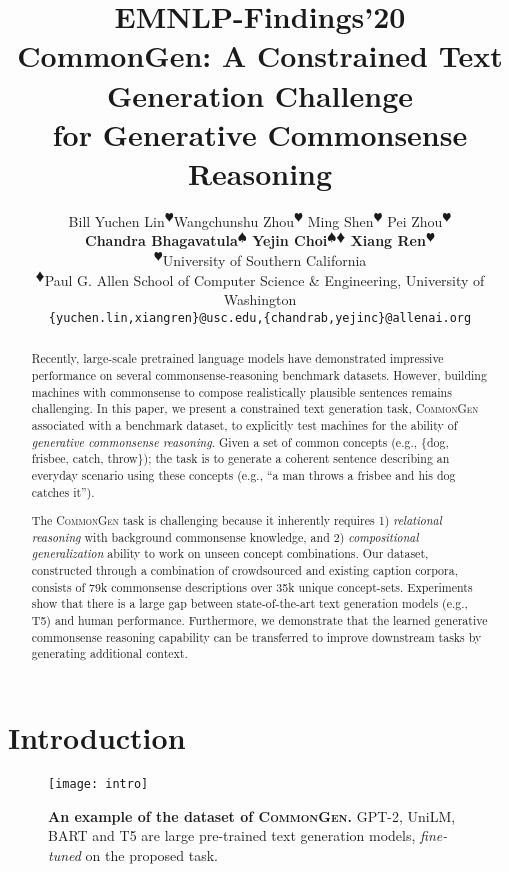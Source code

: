 \documentclass[11pt,a4paper]{article}
\title{\vspace*{-0.5in}
{{\small \hfill EMNLP-Findings'20}\\
\vspace*{.25in}}  {C}ommon{G}en: {A} {C}onstrained {T}ext {G}eneration {C}hallenge \\ for {G}enerative {C}ommonsense {R}easoning}
\author{ 
Bill Yuchen Lin\textsuperscript{{$\varheartsuit$}}\quad  Wangchunshu Zhou\textsuperscript{{$\varheartsuit$}}\quad
Ming Shen\textsuperscript{{$\varheartsuit$}} \quad 
Pei Zhou\textsuperscript{{$\varheartsuit$}} \quad 
\\ \textbf{Chandra Bhagavatula\textsuperscript{{$\spadesuit$}} \quad Yejin Choi\textsuperscript{{$\spadesuit \vardiamondsuit$}}
\quad Xiang Ren\textsuperscript{{$\varheartsuit$}}
}
\\
{{\textsuperscript{$\varheartsuit$}University of Southern California}} \quad {\textsuperscript{$\spadesuit$}Allen Institute for Artificial Intelligence} \\ 
{\textsuperscript{$\vardiamondsuit$}Paul G. Allen School of Computer Science \& Engineering, University of Washington}\\
{
\texttt{\{yuchen.lin,xiangren\}@usc.edu,\{chandrab,yejinc\}@allenai.org}} 
}
\begin{document}
 
\maketitle



\begin{abstract}




Recently, large-scale pretrained language models have demonstrated impressive performance on several commonsense-reasoning benchmark datasets. However, building machines with commonsense to compose realistically plausible sentences remains challenging.
In this paper, we present a constrained text generation task, \textsc{CommonGen} associated with a benchmark dataset, to explicitly test machines for the ability of \textit{generative commonsense reasoning}.
Given a set of common concepts (e.g., \{dog, frisbee, catch, throw\}); the task is to generate a coherent sentence describing an everyday scenario using these concepts (e.g., ``a man throws a frisbee and his dog catches it'').

The \textsc{CommonGen} task is challenging because it inherently requires 1) \textit{relational reasoning} with background  commonsense knowledge, and 2) \textit{compositional generalization} ability to work on unseen concept combinations.
Our dataset, constructed through a combination of crowdsourced and existing caption corpora, consists of 
79k commonsense descriptions over 35k unique concept-sets.
Experiments show that there is  a large gap between state-of-the-art text generation models (e.g., T5) and human performance.
Furthermore, we demonstrate that the learned generative commonsense reasoning capability can be transferred to improve downstream tasks 
by generating additional context.
\end{abstract}

  \section{Introduction}
\label{sec:intro}

\begin{figure}[ht!]
	\centering
	\texttt{[image: intro]}
	\caption{\small{\textbf{An example of the dataset of \textsc{CommonGen}.} GPT-2, UniLM, BART and T5 are large pre-trained text generation models, \textit{fine-tuned} on the proposed task.}
	\vspace{-1em}
	}
	\label{fig:intro}
\end{figure}
\end{document}
